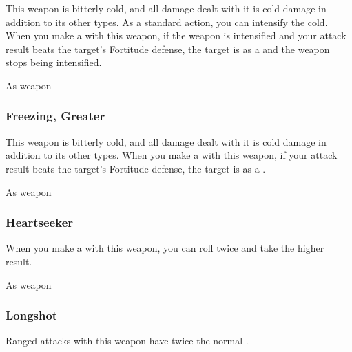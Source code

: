 This weapon is bitterly cold, and all damage dealt with it is cold damage in addition to its other types.
As a standard action, you can intensify the cold.
When you make a  with this weapon, if the weapon is intensified and your attack result beats the target's Fortitude defense,
the target is \fatigued as a  and the weapon stops being intensified.



 


 As weapon


\lowercase{\hypertarget{item:Freezing, Greater}{}}\label{item:Freezing, Greater}
\hypertarget{item:Freezing, Greater}{\subsubsection{Freezing, Greater\hfill{}}}

This weapon is bitterly cold, and all damage dealt with it is cold damage in addition to its other types.
When you make a  with this weapon, if your attack result beats the target's Fortitude defense, the target is \fatigued as a .



 


 As weapon


\lowercase{\hypertarget{item:Heartseeker}{}}\label{item:Heartseeker}
\hypertarget{item:Heartseeker}{\subsubsection{Heartseeker\hfill{}}}

When you make a  with this weapon, you can roll twice and take the higher result.



 


 As weapon


\lowercase{\hypertarget{item:Longshot}{}}\label{item:Longshot}
\hypertarget{item:Longshot}{\subsubsection{Longshot\hfill{}}}

Ranged attacks with this weapon have twice the normal .




